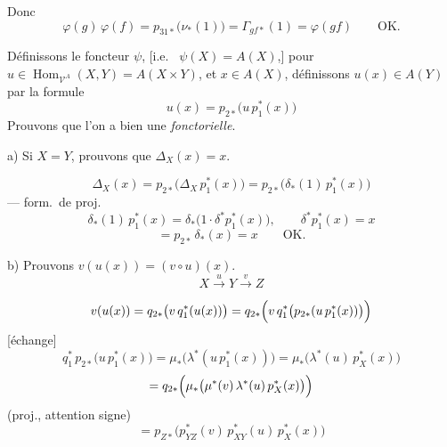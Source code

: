 \documentclass[11pt,a4paper]{article}
\begin{document}
Donc
\[
\varphi(g)\, \varphi(f) = p_{31*}\bigl( \nu_{*}(1) \bigr) = \Gamma_{gf*}(1) = \varphi(gf) \qquad \text{OK.}
\]

Définissons le foncteur $\psi$, [i.e.\ 
$\psi(X) = A(X)$,] pour $u \in \operatorname{Hom}_{\mathcal{V}^{A}}(X,Y) = A(X \times Y)$,
et $x \in A(X)$, définissons $u(x) \in A(Y)$ par la formule
\[ u(x) = p_{2*}\bigl( u\, p_{1}^{*}(x) \bigr) \]
Prouvons que l'on a bien une \emph{ fonctorielle}.


a) Si $X = Y$, prouvons que $\Delta_{X}(x) = x$. 


\[
\Delta_{X}(x) = p_{2*}\bigl( \Delta_{X}\, p_{1}^{*}(x) \bigr) = p_{2*}\bigl( \delta_{*}(1)\, p_{1}^{*}(x) \bigr)
\]
--- form.\ de proj.
\[
\delta_{*}(1)\, p_{1}^{*}(x) = \delta_{*}\bigl( 1 \cdot \delta^{*} p_{1}^{*}(x) \bigr),
\qquad \delta^{*} p_{1}^{*}(x) = x
\]
\[
= p_{2*}\, \delta_{*}(x) = x \qquad \text{OK.}
\]

b) Prouvons $v(u(x)) = (v \circ u)(x)$.
\[ X \xrightarrow{\;u\;} Y \xrightarrow{\;v\;} Z \]


\[
v(u(x)) = q_{2*}\bigl( v\, q_{1}^{*}(u(x)) \bigr)
= q_{2*}\Bigl( v\, q_{1}^{*}\bigl( p_{2*}( u\, p_{1}^{*}(x) ) \bigr) \Bigr)
\]
[échange]
\[
q_{1}^{*}\, p_{2*}\bigl( u\, p_{1}^{*}(x) \bigr) = \mu_{*}\bigl( \lambda^{*}( u\, p_{1}^{*}(x) ) \bigr) = \mu_{*}\bigl( \lambda^{*}(u)\, p_{X}^{*}(x) \bigr)
\]
\[
= q_{2*}\Bigl( \mu_{*}\bigl( \mu^{*}(v)\, \lambda^{*}(u)\, p_{X}^{*}(x) \bigr) \Bigr)
\]
(proj., attention signe)
\[
= p_{Z*}\bigl( p_{YZ}^{*}(v)\, p_{XY}^{*}(u)\, p_{X}^{*}(x) \bigr)
\]

\end{document}
